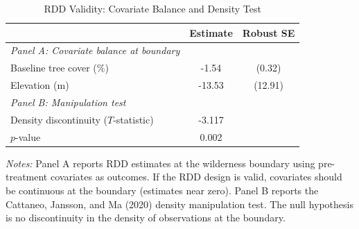 \begin{table}[t]
\centering
\caption{RDD Validity: Covariate Balance and Density Test}
\label{tab:validity}
\begin{tabular}{lcc}
\hline\hline
 & Estimate & Robust SE \\
\hline
\textit{Panel A: Covariate balance at boundary} & & \\
\quad Baseline tree cover (\%) & -1.54 & (0.32) \\
\quad Elevation (m) & -13.53 & (12.91) \\
\hline
\textit{Panel B: Manipulation test} & & \\
\quad Density discontinuity ($T$-statistic) & -3.117 & \\
\quad $p$-value & 0.002 & \\
\hline\hline
\end{tabular}
\begin{tablenotes}[flushleft]
\small
\item \textit{Notes:} Panel A reports RDD estimates at the wilderness boundary using pre-treatment covariates as outcomes. If the RDD design is valid, covariates should be continuous at the boundary (estimates near zero). Panel B reports the Cattaneo, Jansson, and Ma (2020) density manipulation test. The null hypothesis is no discontinuity in the density of observations at the boundary.
\end{tablenotes}
\end{table}
